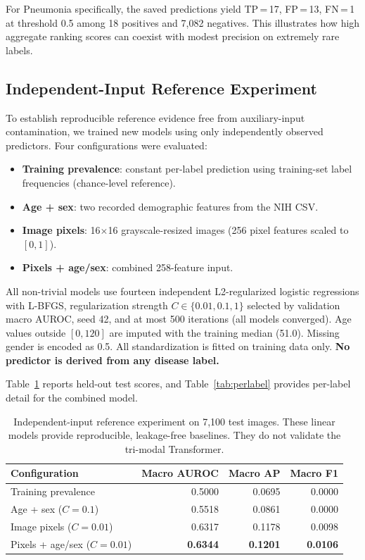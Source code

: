 \documentclass[runningheads,a4paper]{llncs}
\begin{document}
For Pneumonia specifically, the saved predictions yield TP\,=\,17, FP\,=\,13, FN\,=\,1 at threshold 0.5 among 18 positives and 7{,}082 negatives.
This illustrates how high aggregate ranking scores can coexist with modest precision on extremely rare labels.

\subsection{Independent-Input Reference Experiment}
\label{sec:baselines}

To establish reproducible reference evidence free from auxiliary-input contamination, we trained new models using only independently observed predictors.
Four configurations were evaluated:

\begin{itemize}
\item \textbf{Training prevalence}: constant per-label prediction using training-set label frequencies (chance-level reference).
\item \textbf{Age + sex}: two recorded demographic features from the NIH CSV.
\item \textbf{Image pixels}: 16$\times$16 grayscale-resized images (256 pixel features scaled to $[0,1]$).
\item \textbf{Pixels + age/sex}: combined 258-feature input.
\end{itemize}

All non-trivial models use fourteen independent L2-regularized logistic regressions with L-BFGS, regularization strength $C\!\in\!\{0.01, 0.1, 1\}$ selected by validation macro AUROC, seed 42, and at most 500 iterations (all models converged).
Age values outside $[0,120]$ are imputed with the training median (51.0).
Missing gender is encoded as 0.5.
All standardization is fitted on training data only.
\textbf{No predictor is derived from any disease label.}

Table~\ref{tab:independent} reports held-out test scores, and Table~\ref{tab:perlabel} provides per-label detail for the combined model.

\begin{table}[t]
\caption{Independent-input reference experiment on 7{,}100 test images. These linear models provide reproducible, leakage-free baselines. They do not validate the tri-modal Transformer.}
\label{tab:independent}
\centering\small
\begin{tabular}{lrrr}
\toprule
Configuration & Macro AUROC & Macro AP & Macro F1\\
\midrule
Training prevalence & 0.5000 & 0.0695 & 0.0000\\
Age + sex ($C\!=\!0.1$) & 0.5518 & 0.0861 & 0.0000\\
Image pixels ($C\!=\!0.01$) & 0.6317 & 0.1178 & 0.0098\\
Pixels + age/sex ($C\!=\!0.01$) & \textbf{0.6344} & \textbf{0.1201} & \textbf{0.0106}\\
\bottomrule
\end{tabular}
\end{table}
\end{document}

